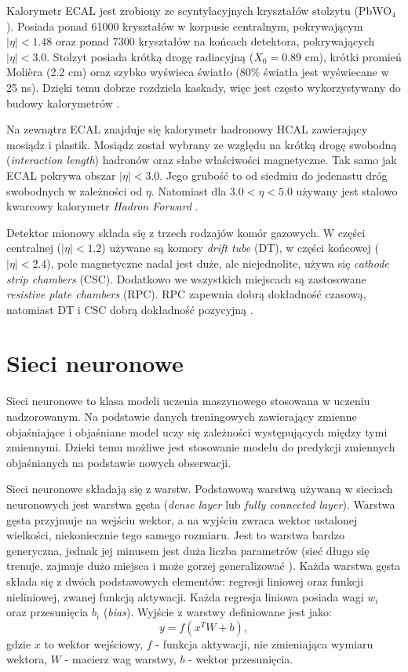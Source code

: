 \documentclass{pracalicmgr}
\begin{document}
	Kalorymetr ECAL jest zrobiony ze scyntylacyjnych kryształów stolzytu (PbWO$_4$). Posiada ponad 61000 kryształów w korpusie centralnym, pokrywającym $|\eta| < 1.48$ oraz ponad 7300 kryształów na końcach detektora, pokrywających $|\eta| < 3.0$. Stolzyt posiada krótką drogę radiacyjną ($X_0 = 0.89$ cm), krótki promień Molièra (2.2 cm) oraz szybko wyświeca światło (80\% światła jest wyświecane w 25 ns). Dzięki temu dobrze rozdziela kaskady, więc jest często wykorzystywany do budowy kalorymetrów \cite{cms_technical}.
	
	Na zewnątrz ECAL znajduje się kalorymetr hadronowy HCAL zawierający mosiądz i plastik. Mosiądz został wybrany ze względu na krótką drogę swobodną (\textit{interaction length}) hadronów oraz słabe właściwości magnetyczne. %
Tak samo jak ECAL pokrywa obszar $|\eta| < 3.0$. Jego grubość to od siedmiu do jedenastu dróg swobodnych w zależności od $\eta$. Natomiast dla $3.0 < \eta < 5.0$ używany jest stalowo kwarcowy kalorymetr \textit{Hadron Forward} \cite{cms_technical}.
	
	
	Detektor mionowy składa się z trzech rodzajów komór gazowych. W części centralnej ($|\eta| < 1.2$) używane są komory \textit{drift tube} (DT), w części końcowej ($|\eta| < 2.4$), pole magnetyczne nadal jest duże, ale niejednolite, używa się \textit{cathode strip chambers} (CSC). Dodatkowo we wszystkich miejscach są zastosowane \textit{resistive plate chambers} (RPC). RPC zapewnia dobrą dokładność czasową, natomiast DT i CSC dobrą dokładność pozycyjną \cite{cms_technical}.
	
	\section{Sieci neuronowe}
	Sieci neuronowe to klasa modeli uczenia maszynowego stosowana w uczeniu nadzorowanym. Na podstawie danych treningowych zawierający zmienne objaśniające i objaśniane model uczy się zależności występujących między tymi zmiennymi. Dzieki temu możliwe jest stosowanie modelu do predykcji zmiennych objaśnianych na podstawie nowych obserwacji.
	
	Sieci neuronowe składają się z warstw. Podstawową warstwą używaną w sieciach neuronowych jest warstwa gęsta (\textit{dense layer} lub \textit{fully connected layer}). Warstwa gęsta przyjmuje na wejściu wektor, a na wyjściu zwraca wektor ustalonej wielkości, niekoniecznie tego samego rozmiaru. Jest to warstwa bardzo generyczna, jednak jej minusem jest duża liczba parametrów (sieć długo się trenuje, zajmuje dużo miejsca i może gorzej generalizować \cite{dl}). Każda warstwa gęsta składa się z dwóch podstawowych elementów: regresji liniowej oraz funkcji nieliniowej, zwanej funkcją aktywacji. Każda regresja liniowa posiada wagi $w_i$ oraz przesunięcia $b_i$ (\textit{bias}). Wyjście z warstwy definiowane jest jako: $$y = f(x^TW + b),$$ gdzie $x$ to wektor wejściowy, $f$ - funkcja aktywacji, nie zmieniająca wymiaru wektora, $W$ - macierz wag warstwy, $b$ - wektor przesunięcia. 
	
\end{document}
